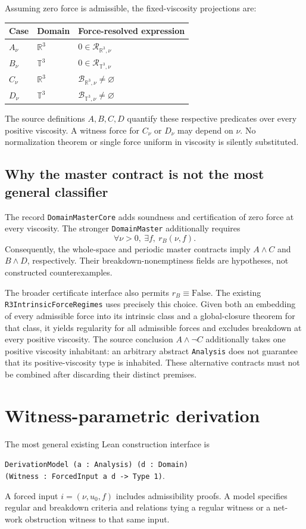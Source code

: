 \documentclass[11pt,a4paper]{article}
\theoremstyle{remark}\newtheorem{remark}[proposition]{Remark}
\newcommand{\R}{\mathbb R}
\newcommand{\T}{\mathbb T}
\newcommand{\Reg}{\mathcal R}
\newcommand{\Bad}{\mathcal B}
\newcommand{\code}[1]{\nolinkurl{#1}}
\begin{document}
Assuming zero force is admissible, the fixed-viscosity projections are:
\begin{center}
\begin{tabular}{lll}
\toprule
Case & Domain & Force-resolved expression\\
\midrule
$A_\nu$ & $\R^3$ & $0\in\Reg_{\R^3,\nu}$\\
$B_\nu$ & $\T^3$ & $0\in\Reg_{\T^3,\nu}$\\
$C_\nu$ & $\R^3$ & $\Bad_{\R^3,\nu}\ne\varnothing$\\
$D_\nu$ & $\T^3$ & $\Bad_{\T^3,\nu}\ne\varnothing$\\
\bottomrule
\end{tabular}
\end{center}
The source definitions $A,B,C,D$ quantify these respective predicates over every positive viscosity. A witness force for $C_\nu$ or $D_\nu$ may depend on $\nu$. No normalization theorem or single force uniform in viscosity is silently substituted.

\subsection{Why the master contract is not the most general classifier}
The record \code{DomainMasterCore} adds soundness and certification of zero force at every viscosity. The stronger \code{DomainMaster} additionally requires
\[
 \forall\nu>0,\ \exists f,\ r_B(\nu,f).
\]
Consequently, the whole-space and periodic master contracts imply $A\land C$ and $B\land D$, respectively. Their breakdown-nonemptiness fields are hypotheses, not constructed counterexamples.

The broader certificate interface also permits $r_B\equiv\mathrm{False}$. The existing \code{R3IntrinsicForceRegimes} uses precisely this choice. Given both an embedding of every admissible force into its intrinsic class and a global-closure theorem for that class, it yields regularity for all admissible forces and excludes breakdown at every positive viscosity. The source conclusion $A\land\neg C$ additionally takes one positive viscosity inhabitant: an arbitrary abstract \code{Analysis} does not guarantee that its positive-viscosity type is inhabited. These alternative contracts must not be combined after discarding their distinct premises.

\section{Witness-parametric derivation}
The most general existing Lean construction interface is
\begin{center}\texttt{DerivationModel (a : Analysis) (d : Domain)}\\
\texttt{(Witness : ForcedInput a d -> Type 1)}.\end{center}
A forced input $i=(\nu,u_0,f)$ includes admissibility proofs. A model specifies regular and breakdown criteria and relations tying a regular witness or a net-work obstruction witness to that same input.
\end{document}
